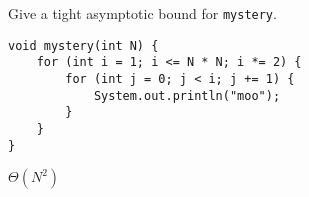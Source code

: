 \begin{blocksection}
\question Give a tight asymptotic bound for \lstinline$mystery$.

\begin{lstlisting}
void mystery(int N) {
    for (int i = 1; i <= N * N; i *= 2) {
        for (int j = 0; j < i; j += 1) {
            System.out.println("moo");
        }
    }
}
\end{lstlisting}

\begin{solution}[1in]
$\Theta(N^2)$
\end{solution}
\end{blocksection}
